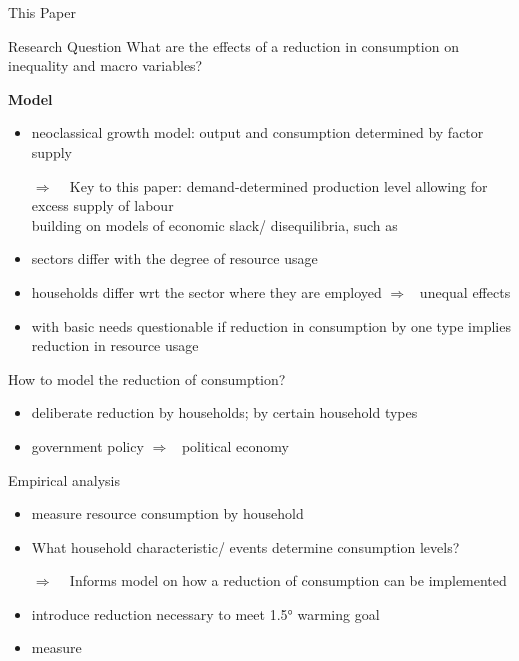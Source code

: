 \documentclass[11pt,aspectratio=169]{beamer}
\newcommand{\ar}{$\Rightarrow$ \ }
\begin{document}
\addtocounter{framenumber}{-1}
\begin{frame}{This Paper}
	\vspace{-4mm}
		\begin{block}{Research Question}
			What are the effects of a reduction in consumption on inequality and macro variables?%
	\end{block}
\textbf{Model}
	\begin{itemize}
		\item neoclassical growth model: output and consumption determined by factor supply
		\item[\ar] Key to this paper: demand-determined production level allowing for excess supply of labour \\
		\small{building on models of economic slack/ disequilibria, such as }
		
		\item sectors differ with the degree of resource usage %
		\item households differ wrt the sector where they are employed \ar unequal effects
		\item with basic needs questionable if reduction in consumption by one type implies reduction in resource usage 
	\end{itemize}
\end{frame}

\begin{frame}{How to model the reduction of consumption?}
	\begin{itemize}
		\item deliberate reduction by households; by certain household types
		\item government policy \ar political economy
	\end{itemize}
	Empirical analysis
\begin{itemize}
	\item measure resource consumption by household
	\item What household characteristic/ events determine consumption levels?
	\item[\ar] Informs model on how a reduction of consumption can be implemented
	\item introduce reduction necessary to meet 1.5° warming goal
	\item measure 
\end{itemize}
\end{frame}
\end{document}

